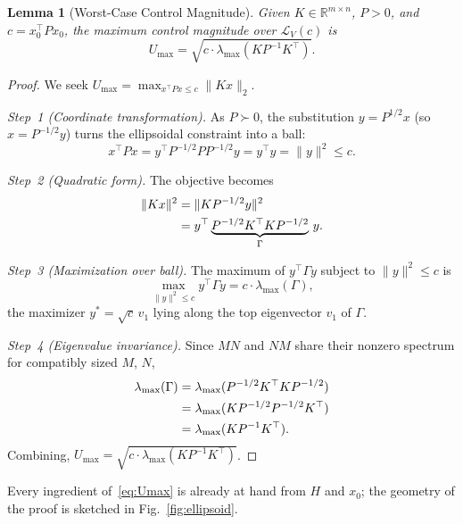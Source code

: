 \documentclass[final,5p,times,authoryear]{elsarticle}
\theoremstyle{plain}
\newtheorem{lemma}{Lemma}
\theoremstyle{definition}
\theoremstyle{remark}
\begin{document}
\begin{lemma}[Worst-Case Control Magnitude]\label{lemma:Umax}
Given $K \in \mathbb{R}^{m \times n}$, $P > 0$, and $c = x_0^\top Px_0$, the
maximum control magnitude over $\mathcal{L}_V(c)$ is
\begin{equation}
U_{\max} = \sqrt{c \cdot \lambda_{\max}(K P^{-1} K^\top)}.
\label{eq:Umax}
\end{equation}
\end{lemma}

\begin{proof}
We seek $U_{\max} = \max_{x^\top Px \leq c} \|Kx\|_2$.

\textit{Step~1 (Coordinate transformation).}  As $P \succ 0$, the
substitution $y = P^{1/2}x$ (so $x = P^{-1/2}y$) turns the ellipsoidal
constraint into a ball:
\begin{equation}
x^\top Px = y^\top P^{-1/2} P P^{-1/2} y = y^\top y = \|y\|^2 \leq c.
\end{equation}

\textit{Step~2 (Quadratic form).}  The objective becomes
\begin{align}
\|Kx\|^2 &= \|KP^{-1/2}y\|^2 \notag \\
          &= y^\top
             \underbrace{P^{-1/2}K^\top K P^{-1/2}}_{\Gamma}\, y.
\end{align}

\textit{Step~3 (Maximization over ball).}  The maximum of
$y^\top \Gamma y$ subject to $\|y\|^2 \leq c$ is
\begin{equation}
\max_{\|y\|^2 \leq c} y^\top \Gamma y = c \cdot \lambda_{\max}(\Gamma),
\end{equation}
the maximizer $y^* = \sqrt{c}\, v_1$ lying along the top eigenvector
$v_1$ of $\Gamma$.

\textit{Step~4 (Eigenvalue invariance).}  Since $MN$ and $NM$ share
their nonzero spectrum for compatibly sized $M$, $N$,
\begin{align}
\lambda_{\max}(\Gamma)
  &= \lambda_{\max}(P^{-1/2}K^\top K P^{-1/2}) \notag \\
  &= \lambda_{\max}(K P^{-1/2} P^{-1/2} K^\top) \notag \\
  &= \lambda_{\max}(K P^{-1} K^\top).
\end{align}
Combining,
$U_{\max} = \sqrt{c \cdot \lambda_{\max}(KP^{-1}K^\top)}$.
\end{proof}

Every ingredient of~\eqref{eq:Umax} is already at hand from $H$ and
$x_0$; the geometry of the proof is sketched in
Fig.~\ref{fig:ellipsoid}.
\end{document}
